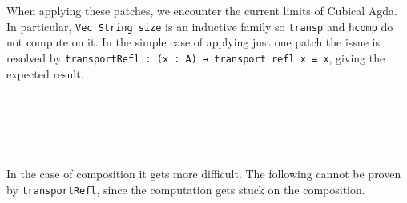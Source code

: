 When applying these patches, we encounter the current limits of Cubical Agda.
In particular, \texttt{Vec String size} is an inductive family so \texttt{transp} and
\texttt{hcomp} do not compute on it. In the simple case of applying just one patch the issue
is resolved by \texttt{transportRefl~:~(x~:~A)~→~transport~refl~x~≡~x}, giving the expected result.
\begin{code}%
%
\>[2]\AgdaFunction{\AgdaUnderscore{}}\AgdaSpace{}%
\AgdaSymbol{:}\AgdaSpace{}%
\AgdaSpace{}%
\AgdaSpace{}%
\AgdaSpace{}%
\AgdaSpace{}%
\<%
\\
%
\>[2]\AgdaSymbol{\AgdaUnderscore{}}\AgdaSpace{}%
\AgdaSymbol{=}\AgdaSpace{}%
\AgdaSpace{}%
\<%
\\
%
\\[\AgdaEmptyExtraSkip]%
%
\>[2]\AgdaFunction{\AgdaUnderscore{}}\AgdaSpace{}%
\AgdaSymbol{:}\AgdaSpace{}%
\AgdaSpace{}%
\AgdaSpace{}%
\AgdaSpace{}%
\AgdaSpace{}%
\AgdaSpace{}%
\AgdaSpace{}%
\AgdaSpace{}%
\AgdaSpace{}%
\AgdaInductiveConstructor{[]}\<%
\\
%
\>[2]\AgdaSymbol{\AgdaUnderscore{}}\AgdaSpace{}%
\AgdaSymbol{=}\AgdaSpace{}%
\AgdaSpace{}%
\AgdaSymbol{\AgdaUnderscore{}}\<%
\end{code}

In the case of composition it gets more difficult. The following cannot be proven by
\texttt{transportRefl}, since the computation gets stuck on the composition.
\begin{code}%
%
\>[2]\AgdaFunction{\AgdaUnderscore{}}\AgdaSpace{}%
\AgdaSymbol{:}\AgdaSpace{}%
\AgdaSpace{}%
\AgdaSpace{}%
\AgdaSpace{}%
\AgdaSpace{}%
\AgdaSpace{}%
\AgdaSpace{}%
\AgdaSpace{}%
\AgdaSpace{}%
\AgdaInductiveConstructor{[]}\<%
\\
%
\>[2]\AgdaSymbol{\AgdaUnderscore{}}\AgdaSpace{}%
\AgdaSymbol{=}\AgdaSpace{}%
\AgdaHole{\{!!\}}\<%
\end{code}

